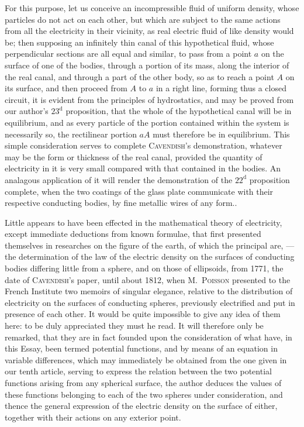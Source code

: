 \documentclass[11pt,notitlepage]{amsart}
\let\Person\textsc
\begin{document}
{For this purpose, let us conceive an incompressible
fluid of uniform density, whose
particles do not act on each other,
but which are subject to the same actions from all
the electricity in their vicinity, as real electric
fluid of like density would be; then supposing an
infinitely thin canal of this hypothetical fluid,
whose perpendicular sections are
all equal and similar, to pass from a point $a$
on the surface of one of the bodies, through
a portion of its mass, along the interior of the real canal,
and through a part of the
other body, so as to reach a point $A$ on its surface,
and then proceed from $A$ to $a$ in
a right line, forming thus a closed circuit,
it is evident from the principles of hydrostatics,
and may be proved from our author's $23^\text{d}$ proposition,
that the whole of the
hypothetical canal will be in equilibrium,
and as every particle of the portion contained
within the system is necessarily so,
the rectilinear portion $aA$ must therefore be in equilibrium.
This simple consideration serves to complete
\Person{Cavendish}'s demonstration,
whatever may be the form or thickness of the real canal,
provided the quantity of electricity
in it is very small compared with that contained in the bodies.
An analagous application
of it will render the demonstration of the $22^\text{d}$
proposition complete, when the two coatings
of the glass plate communicate with their respective conducting bodies,
by fine metallic wires of any form.}.

Little appears to have been effected in the mathematical theory of electricity,
except immediate deductions from known formulae, that first presented
themselves in researches on the figure of the earth, of which the principal
are, --- the determination of the law of the electric density on the surfaces of
conducting bodies differing little from a sphere, and on those of ellipsoids,
from 1771, the date of \Person{Cavendish}'s paper,
until about 1812, when M.~\Person{Poisson}
presented to the French Institute two memoirs of singular elegance, relative
to the distribution of electricity on the surfaces of conducting spheres, 
previously electrified and put in presence of each other. It would be quite 
impossible to give any idea of them here: to be duly appreciated they must he
read. It will therefore only be remarked, that they are in fact founded upon
the consideration of what have, in this Essay, been termed potential functions,
and by means of an equation in variable differences, which may immediately
be obtained from the one given in our tenth article, serving to express the
relation between the two potential functions arising from any spherical 
surface, the author deduces the values of these functions belonging to each of
the two spheres under consideration, and thence the general expression of the
electric density on the surface of either, together with their actions on any
exterior point.
\end{document}

